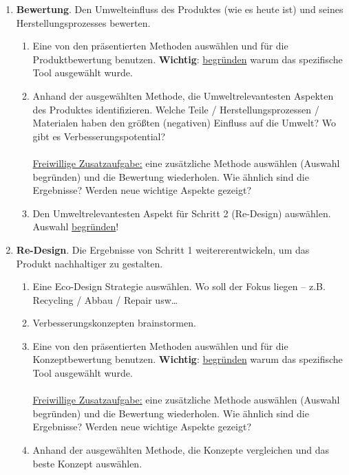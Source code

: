 \documentclass[DIV=15,headinclude=true]{scrartcl}
\begin{document}
\begin{enumerate}
	\item
	      \textbf{Bewertung}. Den Umwelteinfluss des Produktes (wie es heute
	      ist) und seines Herstellungsprozesses bewerten.

	      \begin{enumerate}
		      \item
		            Eine von den präsentierten Methoden auswählen und für die
		            Produktbewertung benutzen. \textbf{Wichtig}: \underline{begründen}
		            warum das spezifische Tool ausgewählt wurde.
		      \item
		            Anhand der ausgewählten Methode, die Umweltrelevantesten Aspekten
		            des Produktes identifizieren. Welche Teile / Herstellungsprozessen /
		            Materialen haben den größten (negativen) Einfluss auf die Umwelt? Wo
		            gibt es Verbesserungspotential?\\
		            ~\\
		            \underline{Freiwillige Zusatzaufgabe:} eine zusätzliche Methode
		            auswählen (Auswahl begründen) und die Bewertung wiederholen. Wie
		            ähnlich sind die Ergebnisse? Werden neue wichtige Aspekte gezeigt?
		      \item
		            Den Umweltrelevantesten Aspekt für Schritt 2 (Re-Design) auswählen.
		            Auswahl \underline{begründen}!
	      \end{enumerate}
	\item
	      \textbf{Re-Design}. Die Ergebnisse von Schritt 1 weitererentwickeln,
	      um das Produkt nachhaltiger zu gestalten.

	      \begin{enumerate}
		      \item
		            Eine Eco-Design Strategie auswählen. Wo soll der Fokus liegen --
		            z.B. Recycling / Abbau / Repair usw\ldots{}
		      \item
		            Verbesserungskonzepten brainstormen.
		      \item
		            Eine von den präsentierten Methoden auswählen und für die
		            Konzeptbewertung benutzen. \textbf{Wichtig}: \underline{begründen}
		            warum das spezifische Tool ausgewählt wurde.\\
		            ~\\
		            \underline{Freiwillige Zusatzaufgabe:} eine zusätzliche Methode
		            auswählen (Auswahl begründen) und die Bewertung wiederholen. Wie
		            ähnlich sind die Ergebnisse? Werden neue wichtige Aspekte gezeigt?
		      \item
		            Anhand der ausgewählten Methode, die Konzepte vergleichen und das
		            beste Konzept auswählen.
	      \end{enumerate}
\end{enumerate}

\cleardoublepage
{}
\printbibliography
\end{document}
